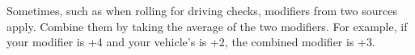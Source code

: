 
Sometimes, such as when rolling for driving checks, modifiers from two sources apply. Combine them by taking the average of the two modifiers. For example, if your  modifier is +4 and your vehicle's  is +2, the combined modifier is +3.
